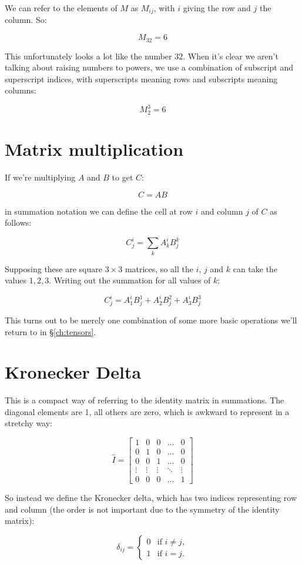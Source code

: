 We can refer to the elements of $M$ as $M_{ij}$, with $i$ giving the row and $j$ the column. So:

$$M_{32} = 6$$

This unfortunately looks a lot like the number $32$. When it's clear we aren't talking about raising numbers to powers, we use a combination of subscript and superscript indices, with superscripts meaning rows and subscripts meaning columns:

$$M^3_2 = 6$$

\section{Matrix multiplication} \label{sec:matrix-multiplication}

If we're multiplying $A$ and $B$ to get $C$:

$$C = AB$$

in summation notation we can define the cell at row $i$ and column $j$ of $C$ as follows:

$$C^i_j = \sum_k{A^i_kB^k_j}$$

Supposing these are square $3 \times 3$ matrices, so all the $i$, $j$ and $k$ can take the values $1, 2, 3$. Writing out the summation for all values of $k$:

$$C^i_j = A^i_1B^1_j + A^i_2B^2_j + A^i_3B^3_j $$

This turns out to be merely one combination of some more basic operations we'll return to in §\ref{ch:tensors}.

\section{Kronecker Delta} \label{def:Kronecker}

This is a compact way of referring to the identity matrix in summations. The diagonal elements are 1, all others are zero, which is awkward to represent in a stretchy way:

$$
\hat{I} = \begin{bmatrix}
1 & 0 & 0 & \dots & 0 \\
0 & 1 & 0 & \dots & 0 \\
0 & 0 & 1 & \dots & 0 \\
\vdots & \vdots & \vdots & \ddots & \vdots\\
0 & 0 & 0 & \dots & 1
\end{bmatrix}
$$

So instead we define the Kronecker delta, which has two indices representing row and column (the order is not important due to the symmetry of the identity matrix):

$$
\delta_{ij} = \begin{cases}
0 &\text{if } i \neq j,   \\
1 &\text{if } i=j.   \end{cases}
$$

